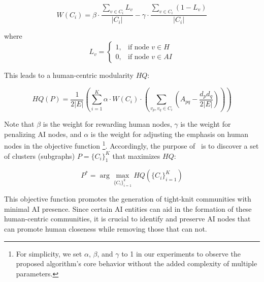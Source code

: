 \begin{equation}
W(C_i) = \beta \cdot \frac{\sum_{v \in C_i} L_v}{|C_i|} - \gamma \cdot \frac{\sum_{v \in C_i} (1 - L_v)}{|C_i|}
\end{equation}
\vspace{0.5em}

\noindent where 
\begin{equation}
L_v =
\begin{cases} 
1, & \text{if node } v \in H \\
0, & \text{if node } v \in AI
\end{cases}
\end{equation}
\vspace{0.5em}

\noindent This leads to a human-centric modularity $HQ$:

\begin{equation}
HQ(P) = \frac{1}{2|E|} \left( \sum_{i=1}^K \alpha \cdot W(C_i) \cdot \left( \sum_{v_p, v_q \in C_i}\left( A_{pq} - \frac{d_p d_q}{2|E|} \right) \right) \right)
\end{equation}
\vspace{0.5em}

\noindent Note that $\beta$ is the weight for rewarding human nodes, $\gamma$ is the weight for penalizing AI nodes, and $\alpha$ is the weight for adjusting the emphasis on human nodes in the objective function \footnote{For simplicity, we set $\alpha$, $\beta$, and $\gamma$ to 1 in our experiments to observe the proposed algorithm’s core behavior without the added complexity of multiple parameters.}. Accordingly, the purpose of \problem\ is to discover a set of clusters (subgraphs) $P = \{ C_i \}_1^K$ that maximizes $HQ$:

\begin{equation}
P^* = \arg \max_{\{C_i\}_{i=1}^k} HQ(\{C_i\}_{i=1}^K)
\end{equation}
\vspace{0.5em}

This objective function promotes the generation of tight-knit communities with minimal AI presence. Since certain AI entities can aid in the formation of these human-centric communities, it is crucial to identify and preserve AI nodes that can promote human closeness while removing those that can not.

